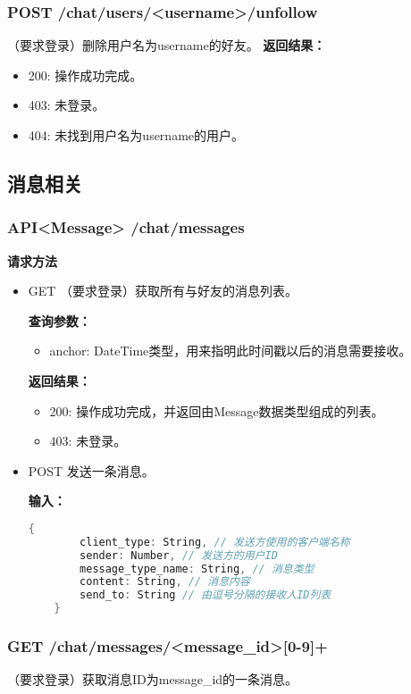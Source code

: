 \subsubsection{\textbf{POST} /chat/users/<username>/unfollow}
（要求登录）删除用户名为username的好友。
\textbf{返回结果：}
\begin{itemize}
    \item 200: 操作成功完成。
    \item 403: 未登录。
    \item 404: 未找到用户名为username的用户。
\end{itemize}

\subsection{消息相关}
\subsubsection{\textbf{API<Message>} /chat/messages}
\textbf{请求方法}
\begin{itemize}
    \item GET
    （要求登录）获取所有与好友的消息列表。

    \textbf{查询参数：}
    \begin{itemize}
        \item anchor: DateTime类型，用来指明此时间戳以后的消息需要接收。
    \end{itemize}

    \textbf{返回结果：}
    \begin{itemize}
    \item 200: 操作成功完成，并返回由Message数据类型组成的列表。
    \item 403: 未登录。
    \end{itemize}
    \item POST
    发送一条消息。

    \textbf{输入：}
    \begin{lstlisting}[language=C]
    {
        client_type: String, // 发送方使用的客户端名称
        sender: Number, // 发送方的用户ID
        message_type_name: String, // 消息类型
        content: String, // 消息内容
        send_to: String // 由逗号分隔的接收人ID列表
    }
    \end{lstlisting}
\end{itemize}

\subsubsection{\textbf{GET} /chat/messages/<message_id>[0-9]+}
（要求登录）获取消息ID为message\_id的一条消息。

